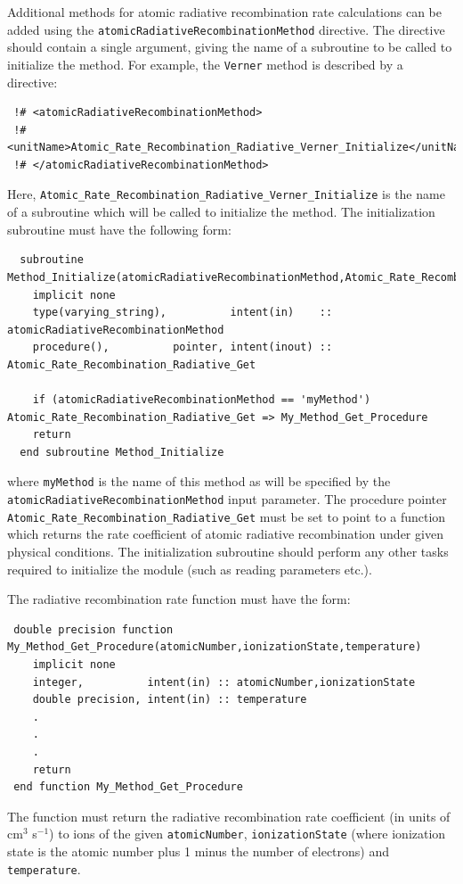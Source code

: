 Additional methods for atomic radiative recombination rate calculations can be added using the {\tt atomicRadiativeRecombinationMethod} directive. The directive should contain a single argument, giving the name of a subroutine to be called to initialize the method. For example, the {\tt Verner} method is described by a directive:
\begin{verbatim}
 !# <atomicRadiativeRecombinationMethod>
 !#  <unitName>Atomic_Rate_Recombination_Radiative_Verner_Initialize</unitName>
 !# </atomicRadiativeRecombinationMethod>
\end{verbatim}
Here, {\tt Atomic\_Rate\_Recombination\_Radiative\_Verner\_Initialize} is the name of a subroutine which will be called to initialize the method. The initialization subroutine must have the following form:
\begin{verbatim}
  subroutine Method_Initialize(atomicRadiativeRecombinationMethod,Atomic_Rate_Recombination_Radiative_Get)
    implicit none
    type(varying_string),          intent(in)    :: atomicRadiativeRecombinationMethod
    procedure(),          pointer, intent(inout) :: Atomic_Rate_Recombination_Radiative_Get
    
    if (atomicRadiativeRecombinationMethod == 'myMethod') Atomic_Rate_Recombination_Radiative_Get => My_Method_Get_Procedure
    return
  end subroutine Method_Initialize
\end{verbatim}
where {\tt myMethod} is the name of this method as will be specified by the {\tt atomicRadiativeRecombinationMethod} input parameter. The procedure pointer {\tt Atomic\_Rate\_Recombination\_Radiative\_Get} must be set to point to a function which returns the rate coefficient of atomic radiative recombination under given physical conditions. The initialization subroutine should perform any other tasks required to initialize the module (such as reading parameters etc.).

The radiative recombination rate function must have the form:
\begin{verbatim}
 double precision function My_Method_Get_Procedure(atomicNumber,ionizationState,temperature)
    implicit none
    integer,          intent(in) :: atomicNumber,ionizationState
    double precision, intent(in) :: temperature
    .
    .
    .
    return
 end function My_Method_Get_Procedure
\end{verbatim}
The function must return the radiative recombination rate coefficient (in units of cm$^3$ s$^{-1}$) to ions of the given {\tt atomicNumber}, {\tt ionizationState} (where ionization state is the atomic number plus 1 minus the number of electrons) and {\tt temperature}.

